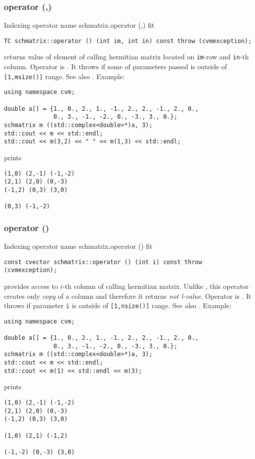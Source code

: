 \subsubsection{operator (,)}
Indexing operator%
\pdfdest name {schmatrix.operator (,)} fit
\begin{verbatim}
TC schmatrix::operator () (int im, int in) const throw (cvmexception);
\end{verbatim}
returns value of element of calling hermitian matrix located on
\verb"im"-row and \verb"in"-th column. 
Operator is \Based.
It throws 
if some of parameters passed
is outside of \verb"[1,msize()]" range.
See also .
Example:
\begin{Verbatim}
using namespace cvm;

double a[] = {1., 0., 2., 1., -1., 2., 2., -1., 2., 0.,
              0., 3., -1., -2., 0., -3., 3., 0.};
schmatrix m ((std::complex<double>*)a, 3);
std::cout << m << std::endl;
std::cout << m(3,2) << " " << m(1,3) << std::endl;
\end{Verbatim}
prints
\begin{Verbatim}
(1,0) (2,-1) (-1,-2)
(2,1) (2,0) (0,-3)
(-1,2) (0,3) (3,0)

(0,3) (-1,-2)
\end{Verbatim}
\newpage




\subsubsection{operator ()}
Indexing operator%
\pdfdest name {schmatrix.operator ()} fit
\begin{verbatim}
const cvector schmatrix::operator () (int i) const throw (cvmexception);
\end{verbatim}
provides access to \hbox{$i$-th} column of calling hermitian matrix.
Unlike ,
this operator creates only \emph{copy} of a column and therefore
it returns
\emph{not  l-value}.
Operator is \Based.
It throws 
if parameter \verb"i" is outside of \verb"[1,nsize()]" range.
See also .
Example:
\begin{Verbatim}
using namespace cvm;

double a[] = {1., 0., 2., 1., -1., 2., 2., -1., 2., 0.,
              0., 3., -1., -2., 0., -3., 3., 0.};
schmatrix m ((std::complex<double>*)a, 3);
std::cout << m << std::endl;
std::cout << m(1) << std::endl << m(3);
\end{Verbatim}
prints
\begin{Verbatim}
(1,0) (2,-1) (-1,-2)
(2,1) (2,0) (0,-3)
(-1,2) (0,3) (3,0)

(1,0) (2,1) (-1,2)

(-1,-2) (0,-3) (3,0)
\end{Verbatim}
\newpage



